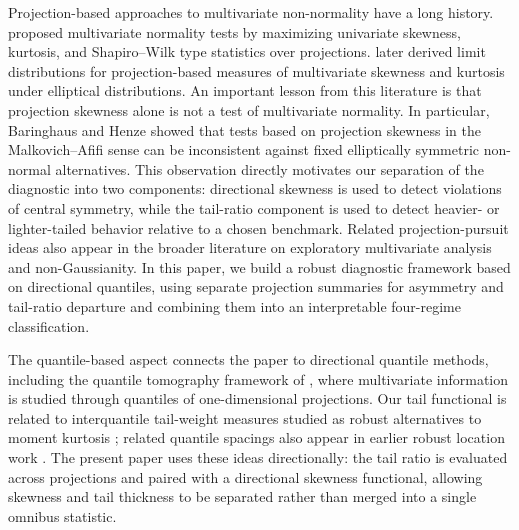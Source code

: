 \documentclass[11pt]{article}
\theoremstyle{plain}
\theoremstyle{definition}
\theoremstyle{remark}
\begin{document}
Projection-based approaches to multivariate non-normality have a long history. \citet{malkovich1973tests} proposed multivariate normality tests by maximizing univariate skewness, kurtosis, and Shapiro--Wilk type statistics over projections. \citet{baringhaus1991limit} later derived limit distributions for projection-based measures of multivariate skewness and kurtosis under elliptical distributions. An important lesson from this literature is that projection skewness alone is not a test of multivariate normality. In particular, Baringhaus and Henze showed that tests based on projection skewness in the Malkovich--Afifi sense can be inconsistent against fixed elliptically symmetric non-normal alternatives. This observation directly motivates our separation of the diagnostic into two components: directional skewness is used to detect violations of central symmetry, while the tail-ratio component is used to detect heavier- or lighter-tailed behavior relative to a chosen benchmark. Related projection-pursuit ideas also appear in the broader literature on exploratory multivariate analysis and non-Gaussianity. In this paper, we build a robust diagnostic framework based on directional quantiles, using separate projection summaries for asymmetry and tail-ratio departure and combining them into an interpretable four-regime classification.

The quantile-based aspect connects the paper to directional quantile methods, including the quantile tomography framework of \citet{kong2012quantile}, where multivariate information is studied through quantiles of one-dimensional projections. Our tail functional is related to interquantile tail-weight measures studied as robust alternatives to moment kurtosis \citep{ruppert1987what,jones2011skewness}; related quantile spacings also appear in earlier robust location work \citep{crow1967robust}. The present paper uses these ideas directionally: the tail ratio is evaluated across projections and paired with a directional skewness functional, allowing skewness and tail thickness to be separated rather than merged into a single omnibus statistic.
\end{document}

